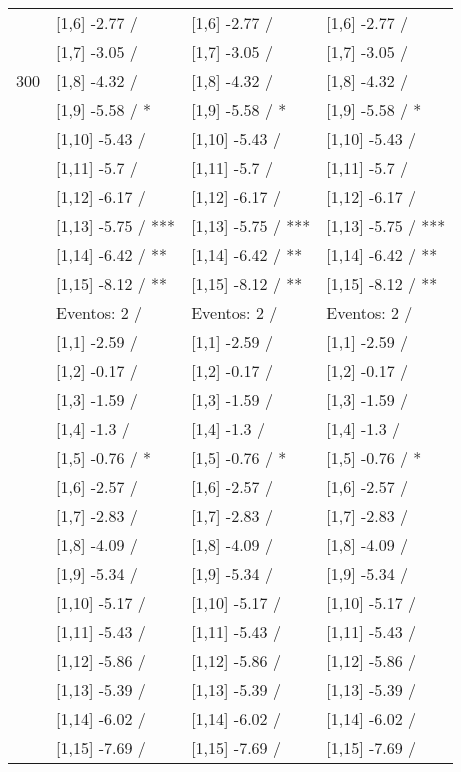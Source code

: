\begin{table}
\begin{tabular}[t]{llll}
 & {}[1,6] -2.77  / & {}[1,6] -2.77  / & {}[1,6] -2.77  /\\
 & {}[1,7] -3.05  / & {}[1,7] -3.05  / & {}[1,7] -3.05  /\\
300 & {}[1,8] -4.32  / & {}[1,8] -4.32  / & {}[1,8] -4.32  /\\
\addlinespace
 & {}[1,9] -5.58  / * & {}[1,9] -5.58  / * & {}[1,9] -5.58  / *\\
 & {}[1,10] -5.43  / & {}[1,10] -5.43  / & {}[1,10] -5.43  /\\
 & {}[1,11] -5.7  / & {}[1,11] -5.7  / & {}[1,11] -5.7  /\\
 & {}[1,12] -6.17  / & {}[1,12] -6.17  / & {}[1,12] -6.17  /\\
 & {}[1,13] -5.75  / *** & {}[1,13] -5.75  / *** & {}[1,13] -5.75  / ***\\
\addlinespace
 & {}[1,14] -6.42  / ** & {}[1,14] -6.42  / ** & {}[1,14] -6.42  / **\\
 & {}[1,15] -8.12  / ** & {}[1,15] -8.12  / ** & {}[1,15] -8.12  / **\\
 & Eventos:  2 / & Eventos:  2 / & Eventos:  2 /\\
 & {}[1,1] -2.59  / & {}[1,1] -2.59  / & {}[1,1] -2.59  /\\
 & {}[1,2] -0.17  / & {}[1,2] -0.17  / & {}[1,2] -0.17  /\\
\addlinespace
 & {}[1,3] -1.59  / & {}[1,3] -1.59  / & {}[1,3] -1.59  /\\
 & {}[1,4] -1.3  / & {}[1,4] -1.3  / & {}[1,4] -1.3  /\\
 & {}[1,5] -0.76  / * & {}[1,5] -0.76  / * & {}[1,5] -0.76  / *\\
 & {}[1,6] -2.57  / & {}[1,6] -2.57  / & {}[1,6] -2.57  /\\
 & {}[1,7] -2.83  / & {}[1,7] -2.83  / & {}[1,7] -2.83  /\\
\addlinespace
500 & {}[1,8] -4.09  / & {}[1,8] -4.09  / & {}[1,8] -4.09  /\\
 & {}[1,9] -5.34  / & {}[1,9] -5.34  / & {}[1,9] -5.34  /\\
 & {}[1,10] -5.17  / & {}[1,10] -5.17  / & {}[1,10] -5.17  /\\
 & {}[1,11] -5.43  / & {}[1,11] -5.43  / & {}[1,11] -5.43  /\\
 & {}[1,12] -5.86  / & {}[1,12] -5.86  / & {}[1,12] -5.86  /\\
\addlinespace
 & {}[1,13] -5.39  / & {}[1,13] -5.39  / & {}[1,13] -5.39  /\\
 & {}[1,14] -6.02  / & {}[1,14] -6.02  / & {}[1,14] -6.02  /\\
 & {}[1,15] -7.69  / & {}[1,15] -7.69  / & {}[1,15] -7.69  /\\
\bottomrule
\end{tabular}
\end{table}
